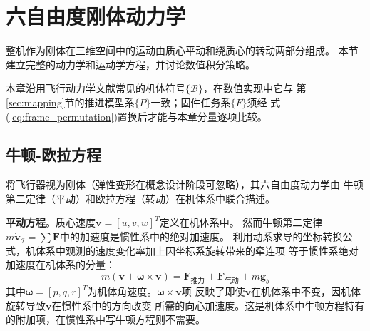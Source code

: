 \section{六自由度刚体动力学}
\label{sec:dynamics}

整机作为刚体在三维空间中的运动由质心平动和绕质心的转动两部分组成。
本节建立完整的动力学和运动学方程，并讨论数值积分策略。

本章沿用飞行动力学文献常见的机体符号$\{\mathcal B\}$，在数值实现中它与
第\ref{sec:mapping}节的推进模型系$\{P\}$一致；固件任务系$\{F\}$须经
式(\ref{eq:frame_permutation})置换后才能与本章分量逐项比较。

\subsection{牛顿-欧拉方程}

将飞行器视为刚体（弹性变形在概念设计阶段可忽略），其六自由度动力学由
牛顿第二定律（平动）和欧拉方程（转动）在机体系中联合描述\cite{stevens2015aircraft}。

\textbf{平动方程}。质心速度$\bm{v} = [u, v, w]^T$定义在机体系中。
然而牛顿第二定律$m\dot{\bm{v}}_{\mathcal{I}} = \sum \bm{F}$中的加速度是惯性系中的绝对加速度。
利用动系求导的坐标转换公式，机体系中观测的速度变化率加上因坐标系旋转带来的牵连项
等于惯性系绝对加速度在机体系的分量：
\begin{equation}
    m \left( \dot{\bm{v}} + \bm{\omega} \times \bm{v} \right)
    = \bm{F}_{\text{推力}} + \bm{F}_{\text{气动}} + m \bm{g}_b
    \label{eq:newton_body}
\end{equation}
其中$\bm{\omega} = [p, q, r]^T$为机体角速度。$\bm{\omega} \times \bm{v}$项
反映了即使$\bm{v}$在机体系中不变，因机体旋转导致$\bm{v}$在惯性系中的方向改变
所需的向心加速度。这是机体系中牛顿方程特有的附加项，在惯性系中写牛顿方程则不需要。


